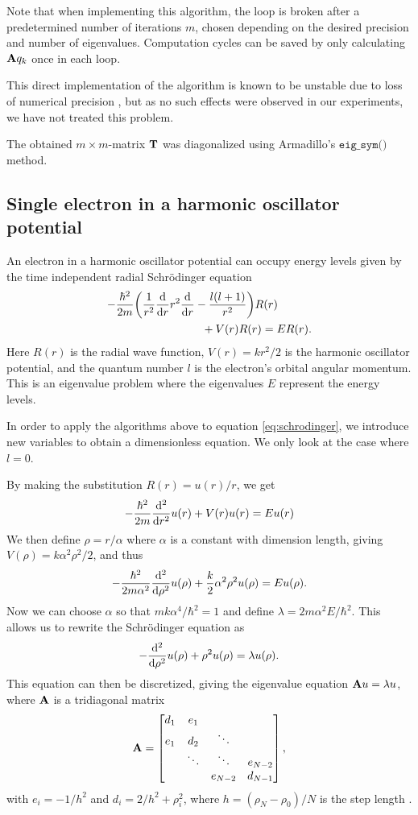 \documentclass[a4paper,10pt,twocolumn]{article}
\begin{document}
Note that when implementing this algorithm, the loop is broken after a predetermined number of iterations $m$, chosen depending on the desired precision and number of eigenvalues. Computation cycles can be saved by only calculating $\vb{A}q_k$ once in each loop. 

This direct implementation of the algorithm is known to be unstable due to loss of numerical precision \cite{matcomp}, but as no such effects were observed in our experiments, we have not treated this problem.  

The obtained $m\times m$-matrix $\vb{T}$ was diagonalized using Armadillo's $\texttt{eig\_sym()}$ method. 

\subsection*{Single electron in a harmonic oscillator potential}
An electron in a harmonic oscillator potential can occupy energy levels given by the time independent radial Schrödinger equation \cite{labtext}
\begin{align}\label{eq:schrodinger}
-\frac{\hbar^2}{2m}&\qty(\frac{1}{r^2}\dv{r}r^2\dv{r}-\frac{l(l+1)}{r^2})R(r) 
\\ &\qquad\qquad\qquad+ V(r)R(r) = ER(r). \nonumber
\end{align} 
Here $R(r)$ is the radial wave function, 
$V(r) = kr^2/2$ is the harmonic oscillator potential,
and the quantum number $l$ is the electron's orbital angular momentum.
This is an eigenvalue problem where the eigenvalues $E$ represent the energy levels.

In order to apply the algorithms above to equation \ref{eq:schrodinger}, we introduce new variables to obtain a dimensionless equation. We only look at the case where $l=0$. 

By making the substitution $R(r) = u(r)/r$, we get
\[
-\frac{\hbar^2}{2m}\dv[2]{r}u(r) + V(r)u(r) = Eu(r)
\]
We then define $\rho = r/\alpha$ where $\alpha$ is a constant with dimension length, giving $V(\rho) = k\alpha^2\rho^2/2$, and thus
\[
-\frac{\hbar^2}{2m\alpha^2}\dv[2]{\rho}u(\rho) + \frac{k}{2}\alpha^2\rho^2u(\rho) = Eu(\rho).
\] 
Now we can choose $\alpha$ so that $mk\alpha^4/\hbar^2 = 1$ and define $\lambda = 2m\alpha^2E/\hbar^2$. This allows us to rewrite the Schrödinger equation as
\[
-\dv[2]{\rho}u(\rho) + \rho^2u(\rho) = \lambda u(\rho).
\]
This equation can then be discretized, giving the eigenvalue equation $\vb{A}u = \lambda u$, where $\vb{A}$ is a tridiagonal matrix
\[
\vb{A} = 
\bmqty{	d_1 & e_1 & &  \\
		e_1	& d_2 & \ddots & \\
		 & \ddots & \ddots & e_{N-2}\\
		 & & e_{N-2} & d_{N-1}},	
\] 
with $e_i = -1/h^2$ and $d_i = 2/h^2+\rho_i^2$, where $h = (\rho_N-\rho_0)/N$ is the step length \cite{labtext}.
\end{document}

